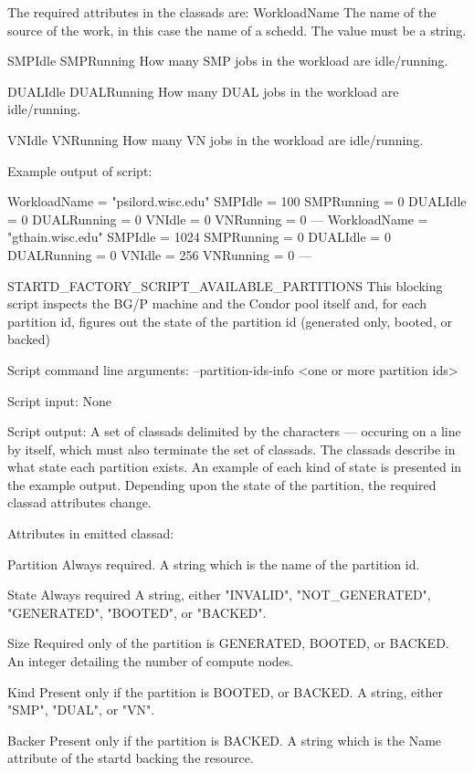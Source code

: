 		The required attributes in the classads are:
			WorkloadName 
				The name of the source of the work, in this case the name of
				a schedd. The value must be a string.

			SMPIdle
			SMPRunning
				How many SMP jobs in the workload are idle/running.

			DUALIdle
			DUALRunning
				How many DUAL jobs in the workload are idle/running.

			VNIdle
			VNRunning
				How many VN jobs in the workload are idle/running.
	
	Example output of script:

		WorkloadName = "psilord\@cs.wisc.edu"
		SMPIdle = 100
		SMPRunning = 0
		DUALIdle = 0
		DUALRunning = 0
		VNIdle = 0
		VNRunning = 0
		---
		WorkloadName = "gthain\@cs.wisc.edu"
		SMPIdle = 1024
		SMPRunning = 0
		DUALIdle = 0
		DUALRunning = 0
		VNIdle = 256
		VNRunning = 0
		---

STARTD_FACTORY_SCRIPT_AVAILABLE_PARTITIONS
	This blocking script inspects the BG/P machine and the Condor
	pool itself and, for each partition id, figures out the state
	of the partition id (generated only, booted, or backed)

	Script command line arguments:
		--partition-ids-info <one or more partition ids>
	
	Script input:
		None
	
	Script output:
		A set of classads delimited by the characters --- occuring
		on a line by itself, which must also terminate the set
		of classads. The classads describe in what state each
		partition exists. An example of each kind of state is
		presented in the example output. Depending upon the state
		of the partition, the required classad attributes change.

		Attributes in emitted classad:

		Partition
			Always required.
			A string which is the name of the partition id.

		State
			Always required
			A string, either 
			"INVALID", "NOT_GENERATED", "GENERATED", "BOOTED", or "BACKED".

		Size
			Required only of the partition is GENERATED, BOOTED, or BACKED.
			An integer detailing the number of compute nodes.

		Kind
			Present only if the partition is BOOTED, or BACKED.
			A string, either "SMP", "DUAL", or "VN".

		Backer
			Present only if the partition is BACKED.
			A string which is the Name attribute of the startd backing
			the resource.


